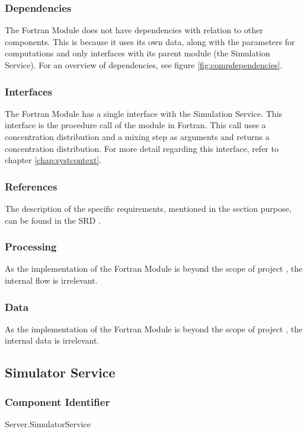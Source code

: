 \subsubsection*{Dependencies}
The Fortran Module does not have dependencies with relation to other components. This is because it uses its own data, along with the parameters for computations and only interfaces with its parent module (the Simulation Service). For an overview of dependencies, see figure \ref{fig:compdependencies}.

\subsubsection*{Interfaces}
The Fortran Module has a single interface with the Simulation Service. This interface is the procedure call of the module in Fortran. This call uses a concentration distribution and a mixing step as arguments and returns a concentration distribution. For more detail regarding this interface, refer to chapter \ref{chap:systcontext}.

\subsubsection*{References}
The description of the specific requirements, mentioned in the section purpose, can be found in the SRD \cite{srd}.

\subsubsection*{Processing}
As the implementation of the Fortran Module is beyond the scope of project \projectname{}, the internal flow is irrelevant.

\subsubsection*{Data}
As the implementation of the Fortran Module is beyond the scope of project \projectname{}, the internal data is irrelevant.

\subsection{Simulator Service}
\label{subsec:simulatorservice}

\subsubsection*{Component Identifier}
Server.SimulatorService

